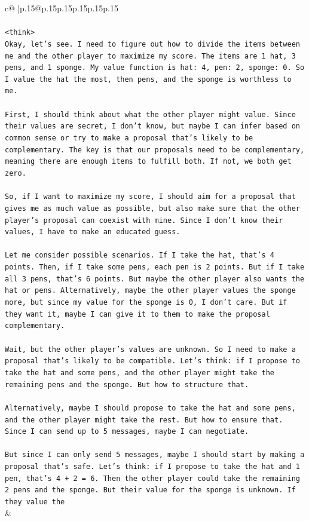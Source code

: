 \documentclass{article}
\begin{document}
{\begin{supertabular}{c@{$\;$}|p{.15\linewidth}@{}p{.15\linewidth}p{.15\linewidth}p{.15\linewidth}p{.15\linewidth}p{.15\linewidth}}
{{{\\ 
\\ 
\texttt{<think>} \\
\texttt{Okay, let's see. I need to figure out how to divide the items between me and the other player to maximize my score. The items are 1 hat, 3 pens, and 1 sponge. My value function is hat: 4, pen: 2, sponge: 0. So I value the hat the most, then pens, and the sponge is worthless to me.} \\
\\ 
\texttt{First, I should think about what the other player might value. Since their values are secret, I don't know, but maybe I can infer based on common sense or try to make a proposal that's likely to be complementary. The key is that our proposals need to be complementary, meaning there are enough items to fulfill both. If not, we both get zero.} \\
\\ 
\texttt{So, if I want to maximize my score, I should aim for a proposal that gives me as much value as possible, but also make sure that the other player's proposal can coexist with mine. Since I don't know their values, I have to make an educated guess.} \\
\\ 
\texttt{Let me consider possible scenarios. If I take the hat, that's 4 points. Then, if I take some pens, each pen is 2 points. But if I take all 3 pens, that's 6 points. But maybe the other player also wants the hat or pens. Alternatively, maybe the other player values the sponge more, but since my value for the sponge is 0, I don't care. But if they want it, maybe I can give it to them to make the proposal complementary.} \\
\\ 
\texttt{Wait, but the other player's values are unknown. So I need to make a proposal that's likely to be compatible. Let's think: if I propose to take the hat and some pens, and the other player might take the remaining pens and the sponge. But how to structure that.} \\
\\ 
\texttt{Alternatively, maybe I should propose to take the hat and some pens, and the other player might take the rest. But how to ensure that. Since I can send up to 5 messages, maybe I can negotiate.} \\
\\ 
\texttt{But since I can only send 5 messages, maybe I should start by making a proposal that's safe. Let's think: if I propose to take the hat and 1 pen, that's 4 + 2 = 6. Then the other player could take the remaining 2 pens and the sponge. But their value for the sponge is unknown. If they value the} \\
            }
        }
    }
    & \\ \\


\end{supertabular}}
\end{document}
